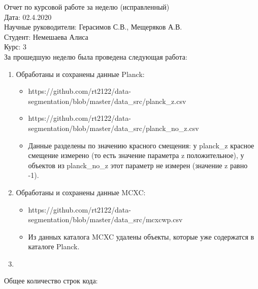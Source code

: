 \documentclass{article}
\begin{document}
Отчет по курсовой работе за неделю (исправленный)\\
Дата: 02.4.2020\\
Научные руководители: Герасимов С.В., Мещеряков А.В.\\
Студент: Немешаева Алиса\\
Курс: 3\\

За прошедшую неделю была проведена следующая работа:\\
\begin{enumerate}
    \item Обработаны и сохранены данные Planck: \\
        \begin{itemize}
            \item https://github.com/rt2122/data-segmentation/blob/master/data\_src/planck\_z.csv\\ 
            \item https://github.com/rt2122/data-segmentation/blob/master/data\_src/planck\_no\_z.csv\\
            \item Данные разделены по значению красного смещения: у planck\_z красное смещение измерено 
                (то есть значение параметра z положительное), у объектов из planck\_no\_z этот параметр не
                измерен (значение z равно -1).\\
        \end{itemize}
    \item Обработаны и сохранены данные MCXC: \\
        \begin{itemize}
            \item https://github.com/rt2122/data-segmentation/blob/master/data\_src/mcxcwp.csv \\
            \item Из данных каталога MCXC удалены объекты, которые уже содержатся в каталоге Planck.\\
        \end{itemize}
    \item 

\end{enumerate}

Общее количество строк кода: \\
\end{document}
